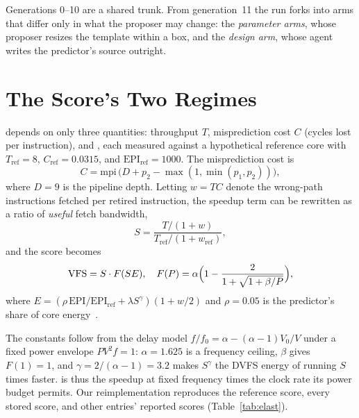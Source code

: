 \documentclass[conference]{IEEEtran}
\newcommand{\vfs}{\text{VFS}}
\newcommand{\epi}{\text{EPI}}
\begin{document}
Generations 0--10 are a shared trunk. From generation~11 the run forks into
arms that differ only in what the proposer may change: the \emph{parameter
arms}, whose proposer resizes the template within a box, and the \emph{design
arm}, whose agent writes the predictor's source outright.

\section{The Score's Two Regimes}

\vfs{} depends on only three quantities: throughput $T$,
misprediction cost $C$ (cycles lost per instruction), and \epi{}, each measured
against a hypothetical reference core with $T_\text{ref}=8$,
$C_\text{ref}=0.0315$, and $\epi{}_\text{ref}=1000$. The misprediction cost is
\begin{equation}
C = \text{mpi}\,\bigl(D + p_2 - \max(1,\min(p_1,p_2))\bigr),
\label{eq:cpi}
\end{equation}
where $D=9$ is the pipeline depth. Letting $w=TC$ denote the wrong-path
instructions fetched per retired instruction, the speedup term can be rewritten
as a ratio of \emph{useful} fetch bandwidth,
\begin{equation}
S = \frac{T/(1+w)}{T_\text{ref}/(1+w_\text{ref})},
\label{eq:speedup}
\end{equation}
and the score becomes
\begin{equation}
\vfs{} = S\cdot F(SE),\quad
F(P)=\alpha\Bigl(1-\frac{2}{1+\sqrt{1+\beta/P}}\Bigr),
\label{eq:vfs}
\end{equation}
where $E=(\rho\,\epi{}/\epi{}_\text{ref}+\lambda S^{\gamma})(1+w/2)$ and
$\rho=0.05$ is the predictor's share of core energy~\cite{vfsmetric}.

The constants follow from the delay model $f/f_0=\alpha-(\alpha-1)V_0/V$ under a
fixed power envelope $PV^2f=1$: $\alpha=1.625$ is a frequency ceiling, $\beta$
gives $F(1)=1$, and $\gamma=2/(\alpha-1)=3.2$ makes $S^\gamma$ the DVFS energy of
running $S$ times faster. \vfs{} is thus the speedup at fixed frequency times
the clock rate its power budget permits. Our reimplementation reproduces the
reference score, every stored score, and other entries' reported scores
(Table~\ref{tab:elast}).
\end{document}
